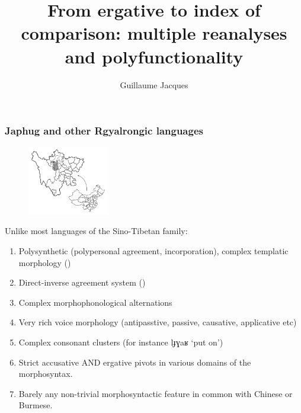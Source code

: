 \documentclass[xcolor=table]{beamer}
\newcommand{\ipa}[1]{{\phon \mbox{#1}}} %
\begin{document}
 \title{From ergative to index of comparison: multiple reanalyses and polyfunctionality}
 \author{Guillaume Jacques}
 \maketitle
 
  \begin{frame} 
 \frametitle{Japhug and other Rgyalrongic languages} 
 \begin{figure}[H]
\centering
\includegraphics[height=30mm]{carte.JPG}
\end{figure}
 
Unlike most languages of the Sino-Tibetan family: 
 
 \begin{enumerate}[<+->]
 \item Polysynthetic (polypersonal agreement, incorporation), complex templatic morphology (\citealt{jacques13harmonization})
  \item Direct-inverse agreement system (\citealt{jacques10inverse})
 \item Complex morphophonological alternations
 \item Very rich voice morphology (antipasstive, passive, causative, applicative etc)
 \item Complex consonant clusters (for instance \ipa{lɟɣaʁ} `put on')
 \item Strict accusative AND ergative pivots in various domains of the morphosyntax.
 \item Barely any non-trivial morphosyntactic feature in common with Chinese or Burmese.
 \end{enumerate}
  
  \end{frame}   
\end{document}
